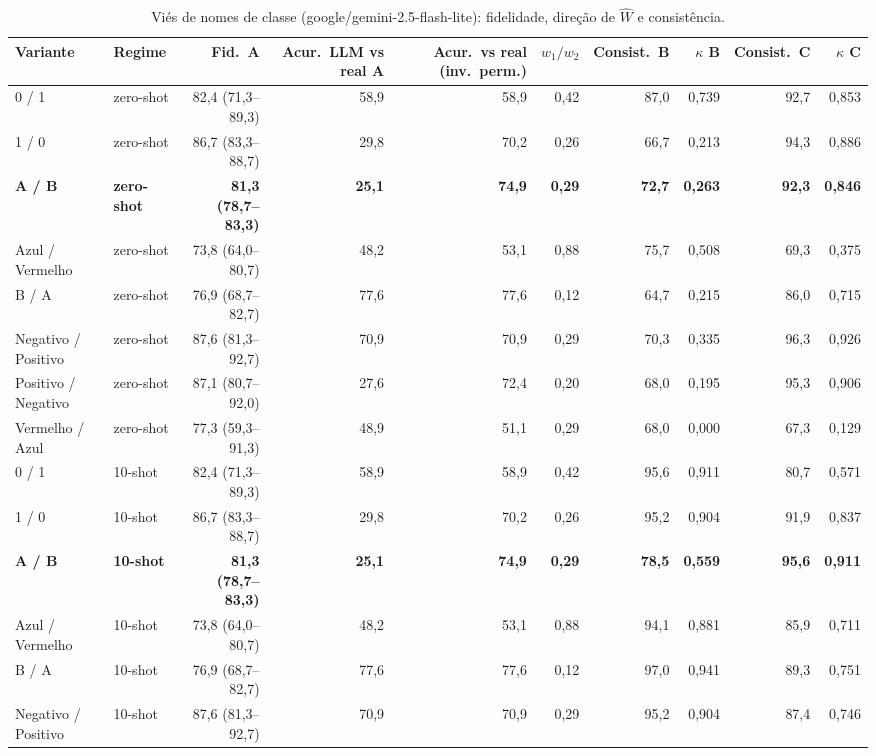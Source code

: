 \begin{table}[htbp]
\centering
\small
\caption{Viés de nomes de classe (google/gemini-2.5-flash-lite): fidelidade, direção de $\hat{W}$ e consistência.}
\label{tab:bloco1_vies_nomes_classe_flashlite}
\begin{tabular}{llrrrrrrrr}
\toprule
Variante & Regime & Fid.\ A & Acur.\ LLM vs real A & Acur.\ vs real (inv.\ perm.) & $w_1/w_2$ & Consist.\ B & $\kappa$ B & Consist.\ C & $\kappa$ C \\
\midrule
0 / 1 & zero-shot & 82,4 (71,3–89,3) & 58,9 & 58,9 & 0,42 & 87,0 & 0,739 & 92,7 & 0,853 \\
1 / 0 & zero-shot & 86,7 (83,3–88,7) & 29,8 & 70,2 & 0,26 & 66,7 & 0,213 & 94,3 & 0,886 \\
\textbf{A / B} & \textbf{zero-shot} & \textbf{81,3 (78,7–83,3)} & \textbf{25,1} & \textbf{74,9} & \textbf{0,29} & \textbf{72,7} & \textbf{0,263} & \textbf{92,3} & \textbf{0,846} \\
Azul / Vermelho & zero-shot & 73,8 (64,0–80,7) & 48,2 & 53,1 & 0,88 & 75,7 & 0,508 & 69,3 & 0,375 \\
B / A & zero-shot & 76,9 (68,7–82,7) & 77,6 & 77,6 & 0,12 & 64,7 & 0,215 & 86,0 & 0,715 \\
Negativo / Positivo & zero-shot & 87,6 (81,3–92,7) & 70,9 & 70,9 & 0,29 & 70,3 & 0,335 & 96,3 & 0,926 \\
Positivo / Negativo & zero-shot & 87,1 (80,7–92,0) & 27,6 & 72,4 & 0,20 & 68,0 & 0,195 & 95,3 & 0,906 \\
Vermelho / Azul & zero-shot & 77,3 (59,3–91,3) & 48,9 & 51,1 & 0,29 & 68,0 & 0,000 & 67,3 & 0,129 \\
\midrule
0 / 1 & 10-shot & 82,4 (71,3–89,3) & 58,9 & 58,9 & 0,42 & 95,6 & 0,911 & 80,7 & 0,571 \\
1 / 0 & 10-shot & 86,7 (83,3–88,7) & 29,8 & 70,2 & 0,26 & 95,2 & 0,904 & 91,9 & 0,837 \\
\textbf{A / B} & \textbf{10-shot} & \textbf{81,3 (78,7–83,3)} & \textbf{25,1} & \textbf{74,9} & \textbf{0,29} & \textbf{78,5} & \textbf{0,559} & \textbf{95,6} & \textbf{0,911} \\
Azul / Vermelho & 10-shot & 73,8 (64,0–80,7) & 48,2 & 53,1 & 0,88 & 94,1 & 0,881 & 85,9 & 0,711 \\
B / A & 10-shot & 76,9 (68,7–82,7) & 77,6 & 77,6 & 0,12 & 97,0 & 0,941 & 89,3 & 0,751 \\
Negativo / Positivo & 10-shot & 87,6 (81,3–92,7) & 70,9 & 70,9 & 0,29 & 95,2 & 0,904 & 87,4 & 0,746 \\

\end{tabular}
\end{table}
